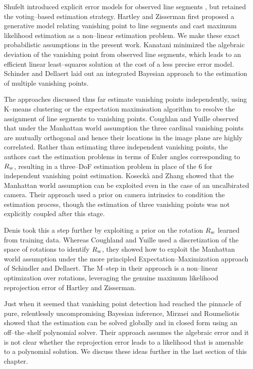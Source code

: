 Shufelt introduced explicit error models for observed line segments
\cite{Shufelt99}, but retained the voting--based estimation
strategy. Hartley and Zisserman \cite{Hartley00} first proposed a
generative model relating vanishing point to line segments and cast
maximum likelihood estimation as a non--linear estimation problem. We
make these exact probabilistic assumptions in the present
work. Kanatani \cite{Kanatani93} minimized the algebraic deviation of
the vanishing point from observed line segments, which leads to an
efficient linear least--squares solution at the cost of a less precise
error model. Schinder and Dellaert \cite{Schindler04} laid out an
integrated Bayesian approach to the estimation of multiple vanishing
points.

The approaches discussed thus far estimate vanishing points
independently, using K--means clustering or the expectation
maximisation algorithm to resolve the assignment of line segments to
vanishing points. Coughlan and Yuille \cite{Coughlan99} observed that
under the Manhattan world assumption the three cardinal vanishing
points are mutually orthogonal and hence their locations in the image
plane are highly correlated. Rather than estimating three independent
vanishing points, the authors cast the estimation problems in terms of
Euler angles corresponding to $\SceneR$, resulting in a three--DoF
estimation problem in place of the 6 for independent vanishing point
estimation. Koseck\`{a} and Zhang \cite{Zhang02} showed that the
Manhattan world assumption can be exploited even in the case of an
uncalbirated camera. Their approach used a prior on camera intrinsics
to condition the estimation process, though the estimation of three
vanishing points was not explicitly coupled after this stage.

Denis \etal \cite{Denis08} took this a step further by exploiting a
prior on the rotation $\SceneR$ learned from training data. Whereas
Coughland and Yuille used a discretization of the space of rotations
to identify $\SceneR$, they showed how to exploit the Manhattan world
assumption under the more principled Expectation--Maximization
approach of Schindler and Dellaert. The M--step in their approach is a
non--linear optimization over rotations, leveraging the genuine
maximum likelihood reprojection error of Hartley and Zisserman.

Just when it seemed that vanishing point detection had reached the
pinnacle of pure, relentlessly uncompromising Bayesian inference,
Mirzaei and Roumeliotis \cite{Mirzaei11} showed that the estimation
can be solved globally and in closed form using an off--the--shelf
polynomial solver. Their approach assumes the algebraic error and it
is not clear whether the reprojection error leads to a likelihood that
is amenable to a polynomial solution. We discuss these ideas further
in the last section of this chapter.

